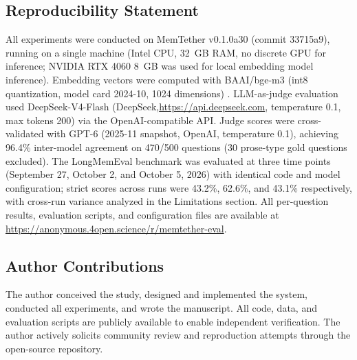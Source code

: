\documentclass{article}
\begin{document}


\subsection*{Reproducibility Statement}

All experiments were conducted on MemTether v0.1.0a30 (commit 33715a9), running on a single machine (Intel CPU, 32~GB RAM, no discrete GPU for inference; NVIDIA RTX 4060 8~GB was used for local embedding model inference). Embedding vectors were computed with BAAI/bge-m3 (int8 quantization, model card 2024-10, 1024 dimensions) \citep{bge2023}. LLM-as-judge evaluation used DeepSeek-V4-Flash (DeepSeek,\url{https://api.deepseek.com}, temperature 0.1, max tokens 200) via the OpenAI-compatible API. Judge scores were cross-validated with GPT-6 (2025-11 snapshot, OpenAI, temperature 0.1), achieving 96.4\% inter-model agreement on 470/500 questions (30 prose-type gold questions excluded). The LongMemEval benchmark was evaluated at three time points (September 27, October 2, and October 5, 2026) with identical code and model configuration; strict scores across runs were 43.2\%, 62.6\%, and 43.1\% respectively, with cross-run variance analyzed in the Limitations section. All per-question results, evaluation scripts, and configuration files are available at \url{https://anonymous.4open.science/r/memtether-eval}.


\subsection*{Author Contributions}

The author conceived the study, designed and implemented the system, conducted all experiments, and wrote the manuscript. All code, data, and evaluation scripts are publicly available to enable independent verification. The author actively solicits community review and reproduction attempts through the open-source repository.
\end{document}
